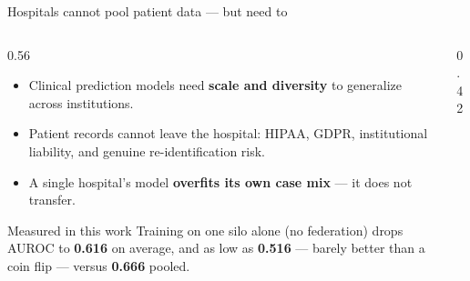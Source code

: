 \documentclass[aspectratio=169, 11pt]{beamer}
\begin{document}
\begin{frame}{Hospitals cannot pool patient data --- but need to}
\begin{columns}[T]
\begin{column}{0.56\textwidth}
\begin{itemize}
\item Clinical prediction models need \textbf{scale and diversity} to
      generalize across institutions.
\item Patient records cannot leave the hospital: HIPAA, GDPR, institutional
      liability, and genuine re-identification risk.
\item A single hospital's model \textbf{overfits its own case mix} --- it
      does not transfer.
\end{itemize}
\vspace{0.6em}
\begin{exampleblock}{Measured in this work}
Training on one silo alone (no federation) drops AUROC to
\textbf{0.616} on average, and as low as \textbf{0.516} --- barely better
than a coin flip --- versus \textbf{0.666} pooled.
\end{exampleblock}
\end{column}
\begin{column}{0.42\textwidth}
\centering
{}
\end{column}
\end{columns}
\end{frame}
\end{document}

